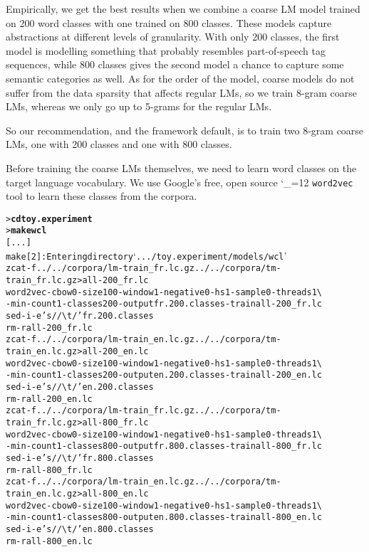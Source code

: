 \documentclass[11pt,letterpaper]{article}
\newcommand{\bs}{\textbackslash{}}
\def\code{\begingroup\catcode`\_=12 \codex}
\newcommand{\codex}[1]{\texttt{#1}\endgroup}
\begin{document}
Empirically, we get the best results when we combine a coarse LM model trained
on 200 word classes with one trained on 800 classes. These models capture
abstractions at different levels of granularity. With only 200 classes, the
first model is modelling something that probably resembles part-of-speech tag
sequences, while 800 classes gives the second model a chance to capture some
semantic categories as well. As for the order of the model, coarse models do
not suffer from the data sparsity that affects regular LMs, so we train 8-gram
coarse LMs, whereas we only go up to 5-grams for the regular LMs.

So our recommendation, and the framework default, is to train two 8-gram coarse
LMs, one with 200 classes and one with 800 classes.

Before training the coarse LMs themselves, we need to learn word classes on the
target language vocabulary. We use Google's free, open source \code{word2vec}
tool to learn these classes from the corpora.

\begin{small}
\begin{alltt}
   > \textbf{cd toy.experiment}
   > \textbf{make wcl}
   [...]
   make[2]: Entering directory `.../toy.experiment/models/wcl'
   zcat -f ../../corpora/lm-train_fr.lc.gz ../../corpora/tm-train_fr.lc.gz > all-200_fr.lc
   word2vec -cbow 0 -size 100 -window 1 -negative 0 -hs 1 -sample 0 -threads 1 \bs
      -min-count 1 -classes 200 -output fr.200.classes -train all-200_fr.lc
   sed -i -e 's/ /{\bs}t/' fr.200.classes
   rm -r all-200_fr.lc
   zcat -f ../../corpora/lm-train_en.lc.gz ../../corpora/tm-train_en.lc.gz > all-200_en.lc
   word2vec -cbow 0 -size 100 -window 1 -negative 0 -hs 1 -sample 0 -threads 1 \bs
      -min-count 1 -classes 200 -output en.200.classes -train all-200_en.lc
   sed -i -e 's/ /{\bs}t/' en.200.classes
   rm -r all-200_en.lc
   zcat -f ../../corpora/lm-train_fr.lc.gz ../../corpora/tm-train_fr.lc.gz > all-800_fr.lc
   word2vec -cbow 0 -size 100 -window 1 -negative 0 -hs 1 -sample 0 -threads 1 \bs
      -min-count 1 -classes 800 -output fr.800.classes -train all-800_fr.lc
   sed -i -e 's/ /{\bs}t/' fr.800.classes
   rm -r all-800_fr.lc
   zcat -f ../../corpora/lm-train_en.lc.gz ../../corpora/tm-train_en.lc.gz > all-800_en.lc
   word2vec -cbow 0 -size 100 -window 1 -negative 0 -hs 1 -sample 0 -threads 1 \bs
      -min-count 1 -classes 800 -output en.800.classes -train all-800_en.lc
   sed -i -e 's/ /{\bs}t/' en.800.classes
   rm -r all-800_en.lc
\end{alltt}
\end{small}
\end{document}
